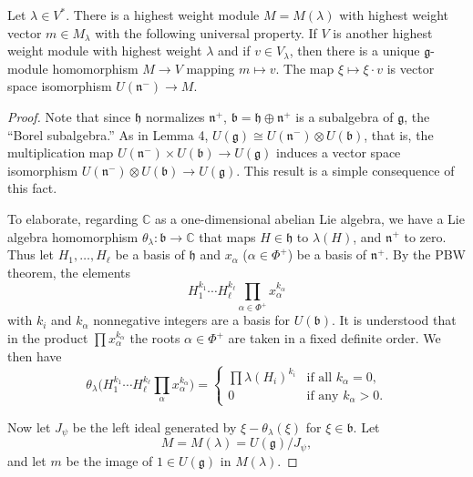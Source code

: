 \documentclass[12pt]{article}
\begin{document}
\begin{theorem}
    Let $\lambda \in V^*$. There is a highest weight module $M = M(\lambda)$ with highest weight vector $m \in M_\lambda$ with the following universal property. If $V$ is another highest weight module with highest weight $\lambda$ and if $v \in V_\lambda$, then there is a unique $\mathfrak{g}$-module homomorphism $M \to V$ mapping $m \mapsto v$. The map $\xi \mapsto \xi \cdot v$ is vector space isomorphism $U(\mathfrak{n}^-) \to M$.
\end{theorem}

\begin{proof}
    Note that since $\mathfrak{h}$ normalizes $\mathfrak{n}^+$, $\mathfrak{b} = \mathfrak{h} \oplus \mathfrak{n}^+$ is a subalgebra of $\mathfrak{g}$, the ``Borel subalgebra.'' As in Lemma 4, $U(\mathfrak{g}) \cong U(\mathfrak{n}^-) \otimes U(\mathfrak{b})$, that is, the multiplication map $U(\mathfrak{n}^-) \times U(\mathfrak{b}) \to U(\mathfrak{g})$ induces a vector space isomorphism $U(\mathfrak{n}^-) \otimes U(\mathfrak{b}) \to U(\mathfrak{g})$. This result is a simple consequence of this fact.

    To elaborate, regarding $\mathbb{C}$ as a one-dimensional abelian Lie algebra, we have a Lie algebra homomorphism $\theta_\lambda : \mathfrak{b} \to \mathbb{C}$ that maps $H \in \mathfrak{h}$ to $\lambda(H)$, and $\mathfrak{n}^+$ to zero. Thus let $H_1, \dots, H_\ell$ be a basis of $\mathfrak{h}$ and $x_\alpha$ ($\alpha \in \Phi^+$) be a basis of $\mathfrak{n}^+$. By the PBW theorem, the elements
    \[
        H_1^{k_1} \cdots H_\ell^{k_\ell} \prod_{\alpha \in \Phi^+} x_\alpha^{k_\alpha}
    \]
    with $k_i$ and $k_\alpha$ nonnegative integers are a basis for $U(\mathfrak{b})$. It is understood that in the product $\prod x_\alpha^{k_\alpha}$ the roots $\alpha \in \Phi^+$ are taken in a fixed definite order. We then have
    \[
        \theta_\lambda \big( H_1^{k_1} \cdots H_\ell^{k_\ell} \prod_{\alpha} x_\alpha^{k_\alpha} \big)
        = \begin{cases}
            \prod \lambda(H_i)^{k_i} & \text{if all } k_\alpha = 0, \\
            0                        & \text{if any } k_\alpha > 0.
        \end{cases}
    \]

    Now let $J_\psi$ be the left ideal generated by $\xi - \theta_\lambda(\xi)$ for $\xi \in \mathfrak{b}$. Let
    \[
        M = M(\lambda) = U(\mathfrak{g})/J_\psi,
    \]
    and let $m$ be the image of $1 \in U(\mathfrak{g})$ in $M(\lambda)$.


\end{proof}
\end{document}
